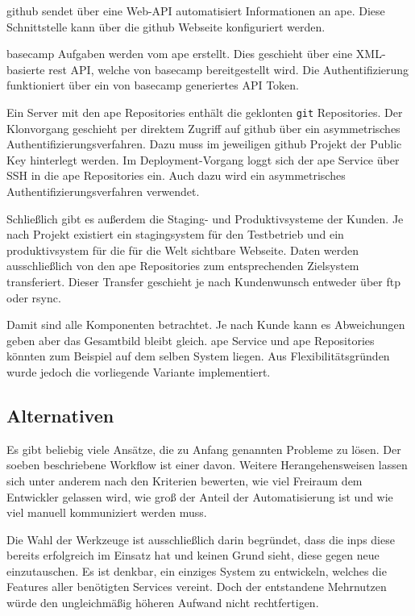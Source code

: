 \gls{github} sendet über eine Web-API automatisiert Informationen an \gls{ape}. Diese Schnittstelle kann über die \gls{github} Webseite konfiguriert werden.

\gls{basecamp} Aufgaben werden vom \gls{ape} erstellt. Dies geschieht über eine XML-basierte \gls{rest} API, welche von \gls{basecamp} bereitgestellt wird. Die Authentifizierung funktioniert über ein von \gls{basecamp} generiertes API Token.

Ein Server mit den \gls{ape} Repositories enthält die geklonten \lstinline!git! Repositories. Der Klonvorgang geschieht per direktem Zugriff auf \gls{github} über ein asymmetrisches Authentifizierungsverfahren. Dazu muss im jeweiligen \gls{github} Projekt der Public Key hinterlegt werden. Im Deployment-Vorgang loggt sich der \gls{ape} Service über SSH in die \gls{ape} Repositories ein. Auch dazu wird ein asymmetrisches Authentifizierungsverfahren verwendet.

Schließlich gibt es außerdem die Staging- und Produktivsysteme der Kunden. Je nach Projekt existiert ein \gls{stagingsystem} für den Testbetrieb und ein \gls{produktivsystem} für die für die Welt sichtbare Webseite. Daten werden ausschließlich von den \gls{ape} Repositories zum entsprechenden Zielsystem transferiert. Dieser Transfer geschieht je nach Kundenwunsch entweder über \gls{ftp} oder \gls{rsync}.

Damit sind alle Komponenten betrachtet. Je nach Kunde kann es Abweichungen geben aber das Gesamtbild bleibt gleich. \gls{ape} Service und \gls{ape} Repositories könnten zum Beispiel auf dem selben System liegen. Aus Flexibilitätsgründen wurde jedoch die vorliegende Variante implementiert.


\subsection{Alternativen} %
\label{sub:alternativen}

Es gibt beliebig viele Ansätze, die zu Anfang genannten Probleme zu lösen. Der soeben beschriebene Workflow ist einer davon. Weitere Herangehensweisen lassen sich unter anderem nach den Kriterien bewerten, wie viel Freiraum dem Entwickler gelassen wird, wie groß der Anteil der Automatisierung ist und wie viel manuell kommuniziert werden muss.

Die Wahl der Werkzeuge ist ausschließlich darin begründet, dass die \gls{inps} diese bereits erfolgreich im Einsatz hat und keinen Grund sieht, diese gegen neue einzutauschen. Es ist denkbar, ein einziges System zu entwickeln, welches die Features aller benötigten Services vereint. Doch der entstandene Mehrnutzen würde den ungleichmäßig höheren Aufwand nicht rechtfertigen.

